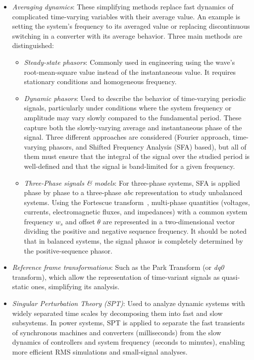 \begin{itemize}
    \item \textit{Averaging dynamics}: These simplifying methods replace fast dynamics of complicated time-varying variables with their average value. 
    An example is setting the system's frequency to its averaged value or replacing discontinuous switching in a converter with its average behavior. 
    Three main methods are distinguished:
    \begin{itemize}
        \item \textit{Steady-state phasors}: Commonly used in engineering using the wave's root-mean-square value instead of the instantaneous value. 
        It requires stationary conditions and homogeneous frequency.
        \item \textit{Dynamic phasors}: Used to describe the behavior of time-varying periodic signals, particularly under conditions where the system frequency 
        or amplitude may vary slowly compared to the fundamental period. These capture both the slowly-varying average and instantaneous phase of the signal. 
        Three different approaches are considered (Fourier approach, time-varying phasors, and Shifted Frequency Analysis (SFA) based), 
        but all of them must ensure that the integral of the signal over the studied period is well-defined and that the signal is band-limited for a given frequency.
        \item \textit{Three-Phase signals \& models}: For three-phase systems, SFA is applied phase by phase to a three-phase \textit{abc} representation to study unbalanced systems. 
        Using the Fortescue transform~\cite{Fortescue1918}, multi-phase quantities (voltages, currents, electromagnetic fluxes, and impedances) with a common system frequency $w_s$ 
        and offset $\theta$ are represented in a two-dimensional vector dividing the positive and negative sequence frequency. 
        It should be noted that in balanced systems, the signal phasor is completely determined by the positive-sequence phasor.
    \end{itemize}

    \item \textit{Reference frame transformations}: Such as the Park Transform (or \textit{dq0} transform), which allow the representation of time-variant signals as quasi-static ones, simplifying its analysis.

    \item \textit{Singular Perturbation Theory (SPT)}: Used to analyze dynamic systems with widely separated time scales by decomposing them into fast and slow subsystems. 
    In power systems, SPT is applied to separate the fast transients of synchronous machines and converters (milliseconds) from the slow dynamics of controllers 
    and system frequency (seconds to minutes), enabling more efficient RMS simulations and small-signal analyses.
\end{itemize}


